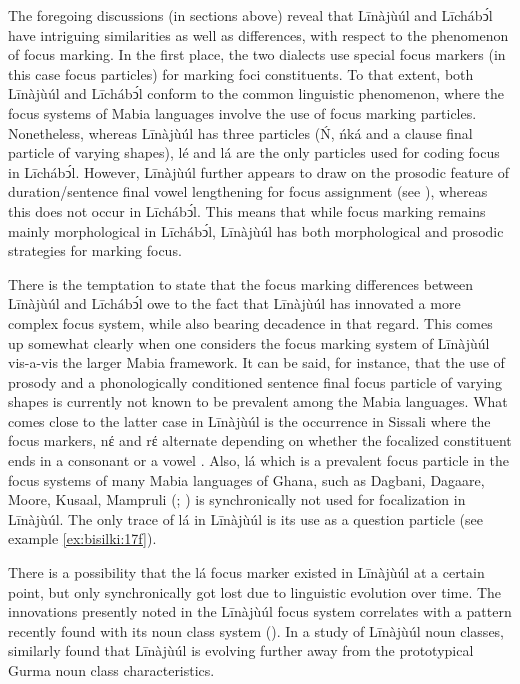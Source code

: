 \documentclass[output=paper,colorlinks,citecolor=brown]{langscibook}
\begin{document}
The foregoing discussions (in sections above) reveal that Līnàjùúl and Līchábͻ́l have intriguing similarities as well as differences, with respect to the phenomenon of focus marking. In the first place, the two dialects use special focus markers (in this case focus particles) for marking foci constituents. To that extent, both Līnàjùúl and Līchábͻ́l conform to the common linguistic phenomenon, where the focus systems of Mabia languages involve the use of focus marking particles. Nonetheless, whereas Līnàjùúl has three particles (Ń, ńká and a clause final particle of varying shapes), lé and lá are the only particles used for coding focus in Līchábͻ́l. However, Līnàjùúl further appears to draw on the prosodic feature of duration/sentence final vowel lengthening for focus assignment (see ), whereas this does not occur in Līchábͻ́l. This means that while focus marking remains mainly morphological in Līchábͻ́l, Līnàjùúl has both morphological and prosodic strategies for marking focus.

There is the temptation to state that the focus marking differences between Līnàjùúl and Līchábͻ́l owe to the fact that Līnàjùúl has innovated a more complex focus system, while also bearing decadence in that regard. This comes up somewhat clearly when one considers the focus marking system of Līnàjùúl vis-a-vis the larger Mabia framework. It can be said, for instance, that the use of prosody and a phonologically conditioned sentence final focus particle of varying shapes is currently not known to be prevalent among the Mabia languages. What comes close to the latter case in Līnàjùúl is the occurrence in Sissali where the focus markers, nέ and rέ alternate depending on whether the focalized constituent ends in a consonant or a vowel \citep{Dumah2017}. Also, lá which is a prevalent focus particle in the focus systems of many Mabia languages of Ghana, such as Dagbani, Dagaare, Moore, Kusaal, Mampruli (\citealt[93]{Bodomo1997}; \citealt{Dakubu2003, Issah2013Focus, Saanchi2005}) is synchronically not used for focalization in Līnàjùúl. The only trace of lá in Līnàjùúl is its use as a question particle (see example \ref{ex:bisilki:17f}).

There is a possibility that the lá focus marker existed in Līnàjùúl at a certain point, but only synchronically got lost due to linguistic evolution over time. The innovations presently noted in the Līnàjùúl focus system correlates with a pattern recently found with its noun class system (\citet{BisilkiAkpanglo-Nartey2017}). In a study of Līnàjùúl noun classes, \citet{BisilkiAkpanglo-Nartey2017} similarly found that Līnàjùúl is evolving further away from the prototypical Gurma noun class characteristics.
\end{document}

